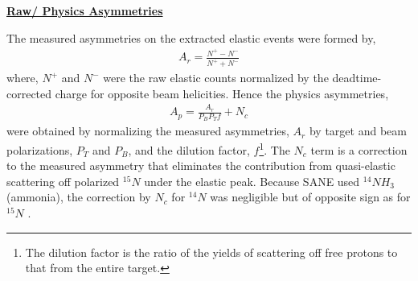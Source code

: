 \documentclass[12pt]{article}
\begin{document}
{
\raggedleft
\underline{\textbf{Raw/ Physics Asymmetries}}
}

The measured asymmetries on the extracted elastic events were formed by,
\begin {equation}
\begin {aligned}
\label {rasym}
A_r=\frac{N^+-N^-}{N^++N^- } 
\end {aligned}
\end {equation}                            
where,  $N^+$ and $N^-$ were the raw elastic counts normalized by the deadtime-corrected charge for opposite beam helicities. Hence the physics asymmetries,
\begin {equation}
\begin {aligned}
\label {pasym}
A_p=\frac{A_r}{P_B P_Tf} +N_c
\end {aligned}
\end {equation}                 
were obtained by normalizing the measured asymmetries, $A_r$ by target and beam polarizations, $P_T$ and $P_B$, and the dilution factor, $f$\footnote{The dilution factor is the ratio of the yields of scattering off free protons to that from the entire target.}. The $N_c$ term is a correction to the measured asymmetry that eliminates the contribution from quasi-elastic scattering off polarized $^{15}N$ under the elastic peak. Because SANE used $^{14}NH_3$ (ammonia), the correction by $N_c$ for $^{14}N$ was negligible but of opposite sign as for $^{15}N$ \cite{60}.

\end{document}
